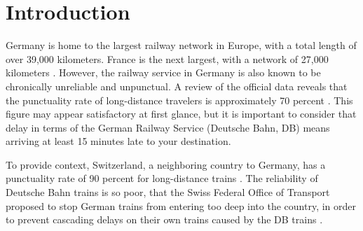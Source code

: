 \documentclass[12pt,a4paper]{article}
\title{\mytitle}
\author{Fabian Becker}
\date{\today}
\begin{document}
    
    
\maketitle

\begin{abstract}
  Although the German railway network is considered the largest in Europe, it is also infamous for being very unreliable. Since 70 percent of long-distance trains are considered to be not punctual, the German government introduced a railway spending programme with the aim of reducing delays and making the train a more desirable mode of transportation. In order for the spending programme to be successful, it is necessary to identify the factors that cause delays. In this paper, several of these factors will be shown, retrieved from a linear regression analysis. The study revealed that specific train station operators and control centers exert an influence on train delay, both positively and negatively. These insights can be employed to identify optimal train organisation strategies and implement them across the entire network. Furthermore, this research can serve as a foundation for identifying other crucial influences through the utilisation of a larger data set containing more information.
\end{abstract}

\section{\label{sec:Introduction}Introduction}

Germany is home to the largest railway network in Europe, with a total length of over 39,000 kilometers. France is the next largest, with a network of 27,000 kilometers \citep[p.~80]{RailwayLengthStat}. 
However, the railway service in Germany is also known to be chronically unreliable and unpunctual. 
A review of the official data reveals that the punctuality rate of long-distance travelers is approximately 70 percent \citep{dpa2023, DBPunctuality2024}. 
This figure may appear satisfactory at first glance, but it is important to consider that delay in terms of the German Railway Service (Deutsche Bahn, DB) means arriving at least 15 minutes late to your destination.

To provide context, Switzerland, a neighboring country to Germany, has a punctuality rate of 90 percent for long-distance trains \citep{SBB2024}. 
The reliability of Deutsche Bahn trains is so poor, that the Swiss Federal Office of Transport proposed to stop German trains from entering too deep into the country, in order to prevent cascading delays on their own trains  caused by the DB trains \citep{Magill2023}.
\end{document}
